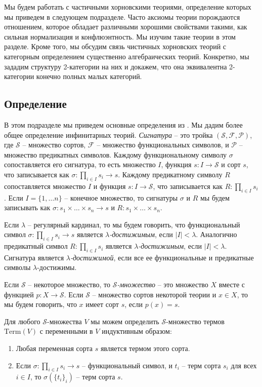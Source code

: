 \documentclass[reqno]{amsart}
\theoremstyle{definition}
\theoremstyle{remark}
\newcommand{\Term}{\mathrm{Term}}
\begin{document}
Мы будем работать с частичными хорновскими теориями, определение которых мы приведем в следующем подразделе.
Часто аксиомы теории порождаются отношением, которое обладает различными хорошими свойствами такими, как сильная нормализация и конфлюэнтность.
Мы изучим такие теории в этом разделе.
Кроме того, мы обсудим связь чистичных хорновских теорий с категорным определением существенно алгебраических теорий.
Конкретно, мы зададим структуру 2-категории на них и докажем, что она эквивалентна 2-категории конечно полных малых категорий.

\subsection{Определение}

В этом подразделе мы приведем основные определения из \cite{PHL}.
Мы дадим более общее определение инфинитарных теорий.
\emph{Сигнатура} -- это тройка $(\mathcal{S},\mathcal{F},\mathcal{P})$, где $\mathcal{S}$ -- множество сортов, $\mathcal{F}$ -- множество функциональных символов, и $\mathcal{P}$ -- множество предикатных символов.
Каждому функциональному символу $\sigma$ сопоставляется его сигнатура, то есть множество $I$, функция $s : I \to \mathcal{S}$ и сорт $s$, что записывается как $\sigma : \prod_{i \in I} s_i \to s$.
Каждому предикатному символу $R$ сопоставляется множество $I$ и функция $s : I \to \mathcal{S}$, что записывается как $R : \prod_{i \in I} s_i$.
Если $I = \{ 1, \ldots n \}$ -- конечное множество, то сигнатуры $\sigma$ и $R$ мы будем записывать как $\sigma : s_1 \times \ldots \times s_n \to s$ и $R : s_1 \times \ldots \times s_n$.

Если $\lambda$ -- регулярный кардинал, то мы будем говорить, что функциональный символ $\sigma : \prod_{i \in I} s_i \to s$ является \emph{$\lambda$-достижимым}, если $|I| < \lambda$.
Аналогично предикатный символ $R : \prod_{i \in I} s_i$ является \emph{$\lambda$-достижимым}, если $|I| < \lambda$.
Сигнатура является \emph{$\lambda$-достижимой}, если все ее функциональные и предикатные символы $\lambda$-достижимы.

\begin{defn}
Если $\mathcal{S}$ -- некоторое множество, то \emph{$\mathcal{S}$-множество} -- это множество $X$ вместе с функцией $p : X \to \mathcal{S}$.
Если $\mathcal{S}$ -- множество сортов некоторой теории и $x \in X$, то мы будем говорить, что $x$ имеет сорт $s$, если $p(x) = s$.
\end{defn}

Для любого $\mathcal{S}$-множества $V$ мы можем определить $\mathcal{S}$-множество термов $\Term(V)$ с переменными в $V$ индуктивным образом:
\begin{enumerate}
\item Любая переменная сорта $s$ является термом этого сорта.
\item Если $\sigma : \prod_{i \in I} s_i \to s$ -- функциональный символ, и $t_i$ -- терм сорта $s_i$ для всех $i \in I$, то $\sigma(\{ t_i \}_i)$ -- терм сорта $s$.
\end{enumerate}
\end{document}
